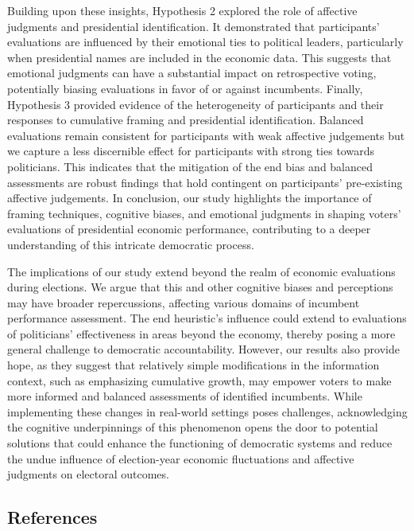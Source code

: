 \documentclass[
]{article}
\begin{document}
Building upon these insights, Hypothesis 2 explored the role of
affective judgments and presidential identification. It demonstrated
that participants' evaluations are influenced by their emotional ties to
political leaders, particularly when presidential names are included in
the economic data. This suggests that emotional judgments can have a
substantial impact on retrospective voting, potentially biasing
evaluations in favor of or against incumbents. Finally, Hypothesis 3
provided evidence of the heterogeneity of participants and their
responses to cumulative framing and presidential identification.
Balanced evaluations remain consistent for participants with weak
affective judgements but we capture a less discernible effect for
participants with strong ties towards politicians. This indicates that
the mitigation of the end bias and balanced assessments are robust
findings that hold contingent on participants' pre-existing affective
judgements. In conclusion, our study highlights the importance of
framing techniques, cognitive biases, and emotional judgments in shaping
voters' evaluations of presidential economic performance, contributing
to a deeper understanding of this intricate democratic process.

The implications of our study extend beyond the realm of economic
evaluations during elections. We argue that this and other cognitive
biases and perceptions may have broader repercussions, affecting various
domains of incumbent performance assessment. The end heuristic's
influence could extend to evaluations of politicians' effectiveness in
areas beyond the economy, thereby posing a more general challenge to
democratic accountability. However, our results also provide hope, as
they suggest that relatively simple modifications in the information
context, such as emphasizing cumulative growth, may empower voters to
make more informed and balanced assessments of identified incumbents.
While implementing these changes in real-world settings poses
challenges, acknowledging the cognitive underpinnings of this phenomenon
opens the door to potential solutions that could enhance the functioning
of democratic systems and reduce the undue influence of election-year
economic fluctuations and affective judgments on electoral outcomes.

\singlespacing

\hypertarget{references}{%
\subsection*{References}\label{references}}
\end{document}
